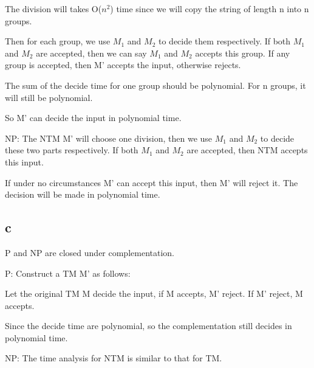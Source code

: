 \documentclass[a4paper,UTF8]{ctexart}
\theoremstyle{definition}
\begin{document}
The division will takes O($n^2$) time since we will copy the string of length n into n groups.

Then for each group, we use $M_1$ and $M_2$ to decide them respectively. If both $M_1$ and $M_2$ are 
accepted, then we can say $M_1$ and $M_2$ accepts this group. If any group is accepted, then M' accepts 
the input, otherwise rejects.

The sum of the decide time for one group should be polynomial. For n groups, it will still be polynomial.

So M' can decide the input in polynomial time.

NP: The NTM M' will choose one division, 
then we use $M_1$ and $M_2$ to decide these two parts respectively. 
If both $M_1$ and $M_2$ are 
accepted, then NTM accepts this input.

If under no circumstances M' can accept this input, then M' will reject it.
The decision will be made in polynomial time.


\subsection*{c}
P and NP are closed under complementation. 

P:
Construct a TM M' as follows:

Let the original TM M decide the input, if M accepts, M' reject. If M' reject, M accepts.

Since the decide time are polynomial, so the complementation still decides in polynomial time.

NP:
The time analysis for NTM is similar to that for TM.
\end{document}
